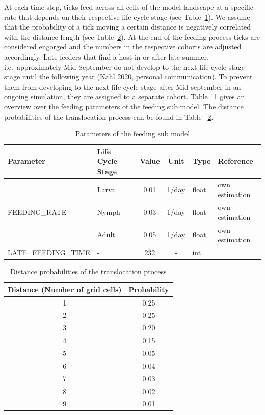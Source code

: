 \documentclass[a4paper, 11pt]{scrartcl}
\begin{document}
At each time step, ticks feed across all cells of the model landscape at a specific rate that depends on their respective life cycle stage (see Table~\ref{tab:feeding_parameters}). We assume that the probability of a tick moving a certain distance is negatively correlated with the distance length (see Table~\ref{tab:distance_probabilities}). At the end of the feeding process ticks are considered engorged and the numbers in the respective cohorts are adjusted accordingly. Late feeders that find a host in or after late summer, i.e.\ approximately Mid-September do not develop to the next life cycle stage stage until the following year (Kahl 2020, personal communication). To prevent them from developing to the next life cycle stage after Mid-september in an ongoing simulation, they are assigned to a separate cohort. Table ~\ref{tab:feeding_parameters} gives an overview over the feeding parameters of the feeding sub model. The distance probabilities of the translocation process can be found in Table ~\ref{tab:distance_probabilities}.


\begin{table}[h!]
\caption{Parameters of the feeding sub model}
\label{tab:feeding_parameters}
\begin{tabularx}{\textwidth}{llccll}
\toprule
\textbf{Parameter} & \textbf{Life Cycle Stage} & \textbf{Value} & \textbf{Unit} & \textbf{Type}	& \textbf{Reference} \\
\midrule
\multirow{3}{*}{\tiny{FEEDING\_RATE}} & Larva	& 0.01	& 1/day & float	 & own estimation \\
									  & Nymph	& 0.03	& 1/day & float	 & own estimation \\
									  & Adult	& 0.05	& 1/day & float	 & own estimation \\

\tiny{LATE\_FEEDING\_TIME}			  & - & 232 & -	& int	 & \cite{tba}  \\
\bottomrule
\end{tabularx}
\end{table}

\begin{table}[h!]
\centering
\caption{Distance probabilities of the translocation process}
\label{tab:distance_probabilities}
\begin{tabularx}{\textwidth}{cc}
\toprule
\textbf{Distance (Number of grid cells)}	& \textbf{Probability}	\\
\midrule
1 	& 0.25 \\
2	& 0.25 \\
3	& 0.20 \\
4	& 0.15 \\
5	& 0.05 \\
6	& 0.04 \\
7	& 0.03 \\
8	& 0.02 \\
9	& 0.01 \\
\bottomrule
\end{tabularx}
\end{table}
\end{document}
